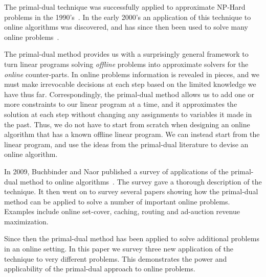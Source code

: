 The primal-dual technique was successfully applied to approximate NP-Hard problems in the 1990's~\cite{goemans92:approx}.
In the early 2000's an application of this technique to online algorithms was discovered, and has since then been used to solve many online problems~\cite{alon:2003:set-cover}.

The primal-dual method provides us with a surprisingly general framework to turn linear programs solving \emph{offline} problems into approximate solvers for the \emph{online} counter-parts.
In online problems information is revealed in pieces, and we must make irrevocable decisions at each step based on the limited knowledge we have thus far.
Correspondingly, the primal-dual method allows us to add one or more constraints to our linear program at a time, and it approximates the solution at each step without changing any assignments to variables it made in the past.
Thus, we do not have to start from scratch when designing an online algorithm that has a known offline linear program.
We can instead start from the linear program, and use the ideas from the primal-dual literature to devise an online algorithm.

In 2009, Buchbinder and Naor published a survey of applications of the primal-dual method to online algorithms~\cite{buchbinder09:survey}.
The survey gave a thorough description of the technique. It then went on to survey several papers showing how the primal-dual method can be applied to solve a number of important online problems. 
Examples include online set-cover, caching, routing and ad-auction revenue maximization.

Since then the primal-dual method has been applied to solve additional problems in an online setting.
In this paper we survey three new application of the technique to very different problems.
This demonstrates the power and applicability of the primal-dual approach to online problems.

